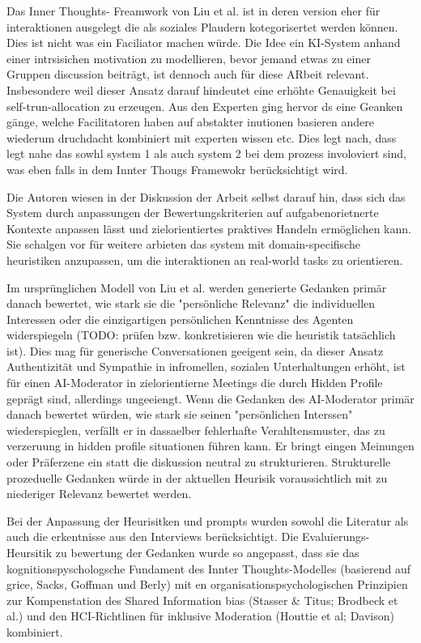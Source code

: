 Das Inner Thoughts- Freamwork von Liu et al. ist in deren version eher für interaktionen ausgelegt die als
soziales Plaudern kotegorisertet werden können. Dies ist nicht was ein Faciliator machen würde. Die Idee ein
KI-System anhand einer intrsisichen motivation zu modellieren, bevor jemand etwas zu einer Gruppen discussion
beiträgt, ist dennoch auch für diese ARbeit relevant.
Insbesondere weil dieser Ansatz darauf hindeutet eine erhöhte Genauigkeit bei self-trun-allocation zu erzeugen.
Aus den Experten ging hervor ds eine Geanken gänge, welche Facilitatoren haben auf abstakter inutionen
basieren andere wiederum druchdacht kombiniert mit experten wissen etc. Dies legt nach,
dass legt nahe das sowhl system 1 als auch system 2 bei dem prozess involoviert sind, was eben falls in dem
Innter Thougs Framewokr berücksichtigt wird.

Die Autoren wiesen in der Diskussion der Arbeit \cite["8.2 Apllying Inner Thougs Beyond Casual
Conversations"]{liuProactiveConversationalAgents2025} selbst darauf hin, dass sich das System durch anpassungen der
Bewertungskriterien auf aufgabenorietnerte Kontexte anpassen lässt und zielorientiertes praktives Handeln
ermöglichen kann. Sie schalgen vor für weitere arbieten das system mit domain-specifische heuristiken
anzupassen, um die interaktionen an real-world tasks zu orientieren.

Im ursprünglichen Modell von Liu et al. werden generierte Gedanken primär danach bewertet, wie stark sie die
"persönliche Relevanz" die individuellen Interessen oder die einzigartigen persönlichen Kenntnisse des
Agenten widerspiegeln (TODO: prüfen bzw. konkretisieren wie die heuristik tatsächlich ist). Dies mag für
generische Conversationen geeigent sein, da dieser Ansatz Authentizität und
Sympathie in infromellen, sozialen Unterhaltungen erhöht, ist für einen AI-Moderator in zielorientierne
Meetings die durch Hidden Profile geprägt sind, allerdings ungeeiengt. Wenn die Gedanken des AI-Moderator
primär danach bewertet würden, wie stark sie seinen "persönlichen Interssen" wiederspieglen, verfällt er in
dassaelber fehlerhafte Verahltensmuster, das zu verzeruung in hidden profile situationen führen kann. Er
bringt eingen Meinungen oder Präferzene ein statt die diskussion neutral zu strukturieren. Strukturelle
prozeduelle Gedanken würde in der aktuellen Heurisik voraussichtlich mit zu niederiger Relevanz bewertet werden.

Bei der Anpassung der Heurisitken und prompts wurden sowohl die Literatur als auch die erkentnisse aus den
Interviews berücksichtigt. Die Evaluierungs-Heursitik zu bewertung der Gedanken wurde so angepasst, dass sie
das kognitionspyschologsche Fundament des Innter Thoughts-Modelles (basierend  auf grice, Sacks, Goffman und
Berly) mit en organisationspsychologischen Prinzipien zur Kompenstation des Shared Information bias (Stasser \&
Titus; Brodbeck et al.) und den HCI-Richtlinen für inklusive Moderation (Houttie et al; Davison) kombiniert.


